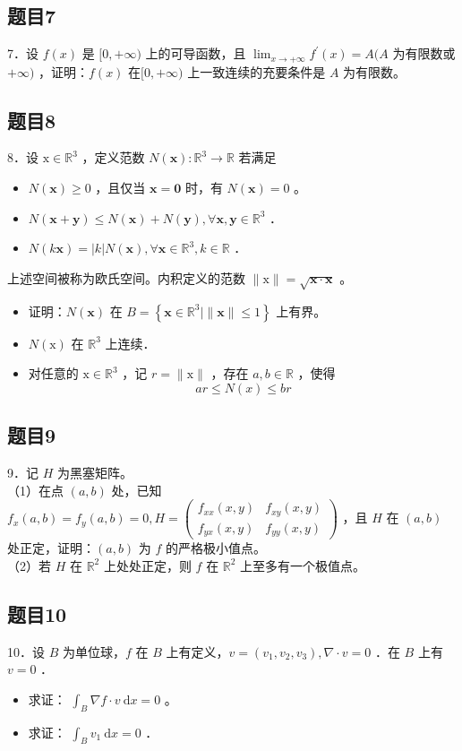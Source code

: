 \documentclass{article}
\begin{document}
\subsection{题目7}
7．设 \(f(x)\) 是 \([0,+\infty)\) 上的可导函数，且 \(\lim _{x \rightarrow+\infty} f^{\prime}(x)=A(A\) 为有限数或 \(+\infty)\) ，证明：\(f(x)\) 在\([0,+\infty)\) 上一致连续的充要条件是 \(A\) 为有限数。

\subsection{题目8}
8．设 \(\mathrm{x} \in \mathbb{R}^{3}\) ，定义范数 \(N(\mathbf{x}): \mathbb{R}^{3} \rightarrow \mathbb{R}\) 若满足

\begin{itemize}
  \item[（1）] \(N(\mathbf{x}) \geq 0\) ，且仅当 \(\mathbf{x}=\mathbf{0}\) 时，有 \(N(\mathbf{x})=0\) 。
  \item[（2）] \(N(\mathbf{x}+\mathbf{y}) \leq N(\mathbf{x})+N(\mathbf{y}), \forall \mathbf{x}, \mathbf{y} \in \mathbb{R}^{3}\) ．
  \item[（3）] \(N(k \mathbf{x})=|k| N(\mathbf{x}), \forall \mathbf{x} \in \mathbb{R}^{3}, k \in \mathbb{R}\) ．
\end{itemize}

上述空间被称为欧氏空间。内积定义的范数 \(\|\mathrm{x}\|=\sqrt{\mathbf{x} \cdot \mathbf{x}}\) 。

\begin{itemize}
  \item[（1）] 证明：\(N(\mathbf{x})\) 在 \(B=\left\{\mathbf{x} \in \mathbb{R}^{3} \mid\|\mathbf{x}\| \leq 1\right\}\) 上有界。
  \item[（2）] \(N(\mathrm{x})\) 在 \(\mathbb{R}^{3}\) 上连续．
  \item[（3）] 对任意的 \(\mathrm{x} \in \mathbb{R}^{3}\) ，记 \(r=\|\mathrm{x}\|\) ，存在 \(a, b \in \mathbb{R}\) ，使得
\[
a r \leq N(x) \leq b r
\]
\end{itemize}

\subsection{题目9}
9．记 \(H\) 为黑塞矩阵。\\
（1）在点 \((a, b)\) 处，已知 \(f_{x}(a, b)=f_{y}(a, b)=0, H=\left(\begin{array}{ll}f_{x x}(x, y) & f_{x y}(x, y) \\ f_{y x}(x, y) & f_{y y}(x, y)\end{array}\right)\) ，且 \(H\) 在 \((a, b)\) 处正定，证明：\((a, b)\) 为 \(f\) 的严格极小值点。\\
（2）若 \(H\) 在 \(\mathbb{R}^{2}\) 上处处正定，则 \(f\) 在 \(\mathbb{R}^{2}\) 上至多有一个极值点。

\subsection{题目10}
10．设 \(B\) 为单位球，\(f\) 在 \(B\) 上有定义，\(v=\left(v_{1}, v_{2}, v_{3}\right), \nabla \cdot v=0\) ．在 \(B\) 上有 \(v=0\) ．

\begin{itemize}
  \item[（1）] 求证： \(\int_{B} \nabla f \cdot v \mathrm{~d} x=0\) 。
  \item[（2）] 求证： \(\int_{B} v_{1} \mathrm{~d} x=0\) ．
\end{itemize}
\end{document}
